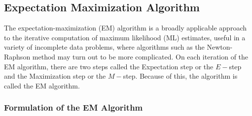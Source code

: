 \subsection*{Expectation Maximization Algorithm}

The expectation-maximization (EM) algorithm is a broadly applicable approach to the
iterative computation of maximum likelihood (ML) estimates, useful in a variety of incomplete data problems, where algorithms such as the Newton-Raphson method may turn out to be more complicated. On each iteration of the EM algorithm, there are two steps called the Expectation step or the $E-$step and the Maximization step or the $M-$step. Because of this, the algorithm is called the EM algorithm.

\subsubsection*{Formulation of the EM Algorithm}

